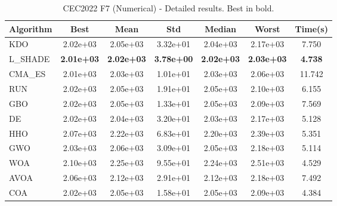 \begin{table}[H]
\centering\small
\caption{CEC2022 F7 (Numerical) - Detailed results. Best in bold.}
\label{tab:cec2022_F7}
\begin{tabular}{lcccccc}
\toprule
\textbf{Algorithm} & \textbf{Best} & \textbf{Mean} & \textbf{Std} & \textbf{Median} & \textbf{Worst} & \textbf{Time(s)} \\
\midrule
KDO & 2.02e+03 & 2.05e+03 & 3.32e+01 & 2.04e+03 & 2.17e+03 & 7.750 \\
L_SHADE & \textbf{2.01e+03} & \textbf{2.02e+03} & \textbf{3.78e+00} & \textbf{2.02e+03} & \textbf{2.03e+03} & \textbf{4.738} \\
CMA_ES & 2.01e+03 & 2.03e+03 & 1.01e+01 & 2.03e+03 & 2.06e+03 & 11.742 \\
RUN & 2.02e+03 & 2.05e+03 & 1.91e+01 & 2.05e+03 & 2.10e+03 & 6.155 \\
GBO & 2.02e+03 & 2.05e+03 & 1.33e+01 & 2.05e+03 & 2.09e+03 & 7.569 \\
DE & 2.02e+03 & 2.04e+03 & 3.20e+01 & 2.03e+03 & 2.17e+03 & 5.128 \\
HHO & 2.07e+03 & 2.22e+03 & 6.83e+01 & 2.20e+03 & 2.39e+03 & 5.351 \\
GWO & 2.03e+03 & 2.06e+03 & 3.09e+01 & 2.05e+03 & 2.18e+03 & 5.114 \\
WOA & 2.10e+03 & 2.25e+03 & 9.55e+01 & 2.24e+03 & 2.51e+03 & 4.529 \\
AVOA & 2.06e+03 & 2.12e+03 & 2.91e+01 & 2.12e+03 & 2.18e+03 & 7.492 \\
COA & 2.02e+03 & 2.05e+03 & 1.58e+01 & 2.05e+03 & 2.09e+03 & 4.384 \\
\bottomrule
\end{tabular}
\end{table}
